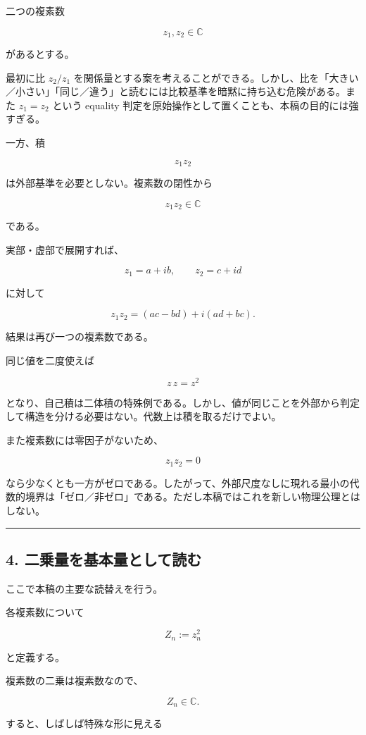 \documentclass[
  a4paper,
]{ltjsarticle}
\begin{document}
二つの複素数

\[
z_1,z_2\in\mathbb C
\]

があるとする。

最初に比 \(z_2/z_1\)
を関係量とする案を考えることができる。しかし、比を「大きい／小さい」「同じ／違う」と読むには比較基準を暗黙に持ち込む危険がある。また
\(z_1=z_2\) という equality
判定を原始操作として置くことも、本稿の目的には強すぎる。

一方、積

\[
z_1z_2
\]

は外部基準を必要としない。複素数の閉性から

\[
z_1z_2\in\mathbb C
\]

である。

実部・虚部で展開すれば、

\[
z_1=a+ib,\qquad z_2=c+id
\]

に対して

\[
z_1z_2=(ac-bd)+i(ad+bc).
\]

結果は再び一つの複素数である。

同じ値を二度使えば

\[
z\,z=z^2
\]

となり、自己積は二体積の特殊例である。しかし、値が同じことを外部から判定して構造を分ける必要はない。代数上は積を取るだけでよい。

また複素数には零因子がないため、

\[
z_1z_2=0
\]

なら少なくとも一方がゼロである。したがって、外部尺度なしに現れる最小の代数的境界は「ゼロ／非ゼロ」である。ただし本稿ではこれを新しい物理公理とはしない。

\begin{center}\rule{0.5\linewidth}{0.5pt}\end{center}

\subsection{4.
二乗量を基本量として読む}\label{ux4e8cux4e57ux91cfux3092ux57faux672cux91cfux3068ux3057ux3066ux8aadux3080}

ここで本稿の主要な読替えを行う。

各複素数について

\[
\boxed{Z_n:=z_n^2}
\]

と定義する。

複素数の二乗は複素数なので、

\[
Z_n\in\mathbb C.
\]

すると、しばしば特殊な形に見える
\end{document}
